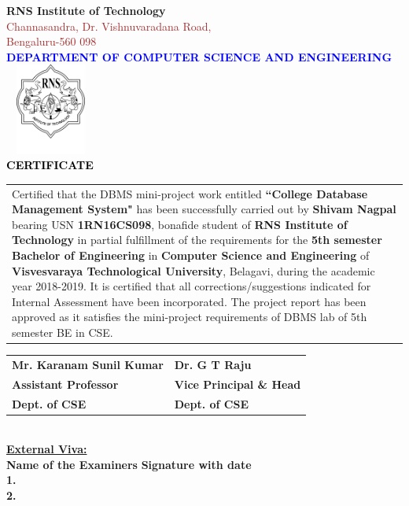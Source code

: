 \thispagestyle{empty}
\begin{center}
\break\break
\textup{\large {\textcolor{darkbrown}{\bf RNS Institute of Technology}} \\
{\normalsize{\textcolor{brown}{Channasandra, Dr. Vishnuvaradana Road,\\ Bengaluru-560 098}}}}\\[0.1in]
\textup{\normalsize {\textcolor{blue}{\bf DEPARTMENT OF COMPUTER SCIENCE AND ENGINEERING}}}\\[0.1in]
\includegraphics[width=3cm, height=3cm]{./RNS_logo.png}\\[0.1in]
\textup{\large {\textcolor{black}{\textbf {CERTIFICATE}}}} \\[0.1in]
\end{center}

\justify
\begin{tabular}{p{15cm}}
\hspace{0.4cm} Certified that the DBMS mini-project work entitled \textbf{``College Database Management System"} has been successfully carried out by \textbf{Shivam Nagpal} bearing USN \textbf{1RN16CS098}, bonafide student of \textbf{RNS Institute of Technology } in partial fulfillment of the requirements for the \textbf{5th semester Bachelor of Engineering} in \textbf{Computer Science and Engineering} of \textbf{Visvesvaraya Technological University}, Belagavi, during the academic year 2018-2019. It is certified that all corrections/suggestions indicated for Internal Assessment have been incorporated. The project report has been approved as it satisfies the mini-project requirements of DBMS lab of 5th semester BE in CSE.\\[0.7in]
\end{tabular}

\justify
\begin{tabular}{l l}
\textbf{Mr. Karanam Sunil Kumar} & \hspace{1.7in}\textbf{Dr. G T Raju}\\
\textbf{Assistant Professor} & \hspace{1.7in}\textbf{Vice Principal \& Head}\\
\textbf{Dept. of CSE} & \hspace{1.7in}\textbf{Dept. of CSE}\\[0.2in]
\end{tabular}
\\[0.3in]

\justify
\textup{\underline{\textbf{External Viva:}}} \\
\textup{\textbf{Name of the Examiners}}\hspace{6cm} {\textbf{Signature with date}} \\
\justify
\textup{\textbf{1.}} \\[0.4in]
\textup{\textbf{2.}}
\newpage
